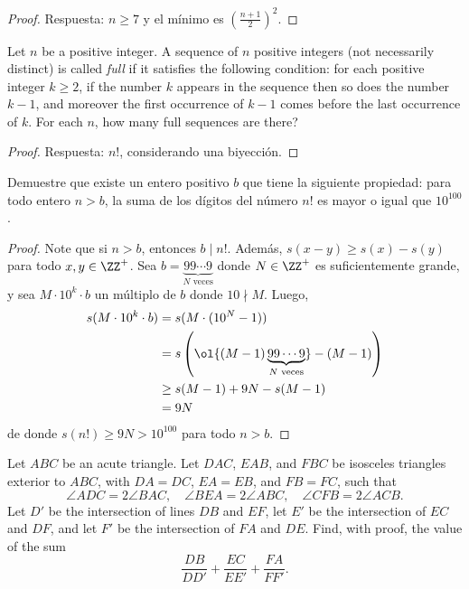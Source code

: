 \begin{proof}
	Respuesta: $n\ge 7$ y el mínimo es $\left(\frac{n+1}{2}\right)^2$.
\end{proof}

\begin{probMR}[ISL 2002/C3]
	Let $n$ be a positive integer. A sequence of $n$ positive integers (not necessarily distinct) is called \emph{full} if it satisfies the following condition: for each positive integer $k\ge 2$, if the number $k$ appears in the sequence then so does the number $k-1$, and moreover the first occurrence of $k-1$ comes before the last occurrence of $k$. For each $n$, how many full sequences are there?
\end{probMR}

\begin{proof}
	Respuesta: $n!$, considerando una biyección.
\end{proof}


\begin{probEG}[Russia 2022]
	Demuestre que existe un entero positivo $b$ que tiene la siguiente propiedad: para todo entero $n>b$, la suma de los dígitos del número $n!$ es mayor o igual que $10^{100}$.
\end{probEG}

\begin{proof}
	Note que si $n>b$, entonces $b\mid n!$. Además, $s(x-y)\ge s(x)-s(y)$ para todo $x,y\in\ZZ^+$. Sea $b=\underbrace{99\cdots 9}_{N\text{ veces}}$ donde $N\in\ZZ^+$ es suficientemente grande, y sea $M\cdot 10^k\cdot b$ un múltiplo de $b$ donde $10\nmid M$. Luego,
	\begin{align*}
		s(M\cdot 10^k\cdot b)
		&=s(M\cdot(10^N-1))\\
		&=s\left(\ol{(M-1)\underbrace{99\cdots 9}_{N\text{ veces}}}-(M-1)\right)\\
		&\ge s(M-1)+9N-s(M-1)\\
		&=9N
	\end{align*}
	de donde $s(n!)\ge 9N>10^{100}$ para todo $n>b$.
\end{proof}


\begin{probEG}[ISL 2001/G5]
	Let $ABC$ be an acute triangle. Let $DAC$, $EAB$, and $FBC$ be isosceles triangles exterior to $ABC$, with $DA=DC$, $EA=EB$, and $FB=FC$, such that
	\[\angle ADC=2\angle BAC,\quad\angle BEA=2\angle ABC,\quad\angle CFB=2\angle ACB.\]
	Let $D'$ be the intersection of lines $DB$ and $EF$, let $E'$ be the intersection of $EC$ and $DF$, and let $F'$ be the intersection of $FA$ and $DE$. Find, with proof, the value of the sum
	\[\frac{DB}{DD'}+\frac{EC}{EE'}+\frac{FA}{FF'}.\]
\end{probEG}

